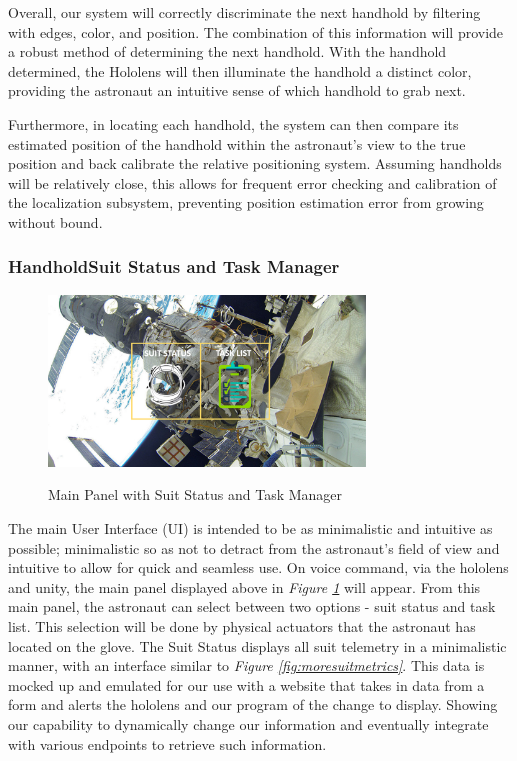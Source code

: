 \documentclass{article}
\let\Oldsubsubsection\subsubsection
\renewcommand{\subsubsection}{\FloatBarrier\Oldsubsubsection}
\begin{document}
Overall, our system will correctly discriminate the next handhold by filtering with edges, color, and position. The combination of this information will provide a robust method of determining the next handhold. With the handhold determined, the Hololens will then illuminate the handhold a distinct color, providing the astronaut an intuitive sense of which handhold to grab next.

Furthermore, in locating each handhold, the system can then compare its estimated position of the handhold within the astronaut’s view to the true position and back calibrate the relative positioning system. Assuming handholds will be relatively close, this allows for frequent error checking and calibration of the localization subsystem, preventing position estimation error from growing without bound.

\subsubsection{HandholdSuit Status and Task Manager}

\begin{figure}[!htb]
  \centering
  \caption{Main Panel with Suit Status and Task Manager}
  \includegraphics[width=0.75\textwidth]{assets/suitdatatasklist.png}
  \label{fig:suitdatatasklist}
\end{figure}

The main User Interface (UI) is intended to be as minimalistic and intuitive as possible; minimalistic so as not to detract from the astronaut’s field of view and intuitive to allow for quick and seamless use. On voice command, via the hololens and unity, the main panel displayed above in \textit{Figure \ref{fig:suitdatatasklist}} will appear. From this main panel, the astronaut can select between two options - suit status and task list. This selection will be done by physical actuators that the astronaut has located on the glove. The Suit Status displays all suit telemetry in a minimalistic manner, with an interface similar to \textit{Figure \ref{fig:moresuitmetrics}}. This data is mocked up and emulated for our use with a website that takes in data from a form and alerts the hololens and our program of the change to display. Showing our capability to dynamically change our information and eventually integrate with various endpoints to retrieve such information.
\end{document}
